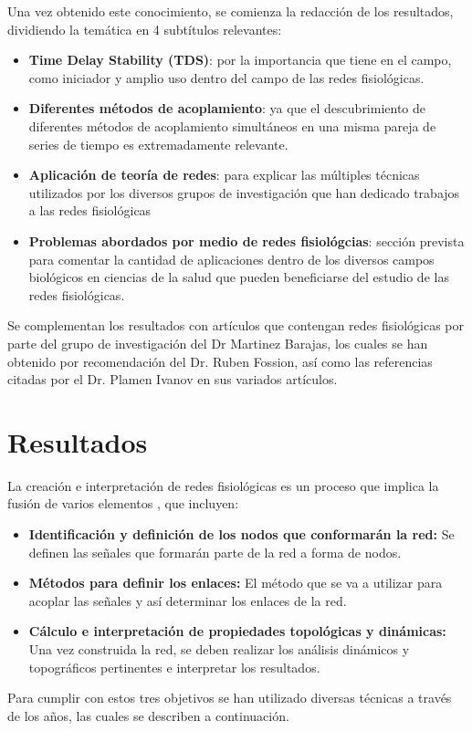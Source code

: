 \documentclass[twoside,twocolumn]{article}
\begin{document}
Una vez obtenido este conocimiento, se comienza la redacción de los resultados, dividiendo la temática en 4 subtítulos relevantes:
\begin{itemize}
  \item \textbf{Time Delay Stability (TDS)}: por la importancia que tiene en el campo, como iniciador y amplio uso dentro del campo de las redes fisiológicas.
  \item \textbf{Diferentes métodos de acoplamiento}: ya que el descubrimiento de diferentes métodos de acoplamiento simultáneos en una misma pareja de series de tiempo es extremadamente relevante.
  \item \textbf{Aplicación de teoría de redes}: para explicar las múltiples técnicas utilizados por los diversos grupos de investigación que han dedicado trabajos a las redes fisiológicas
  \item \textbf{Problemas abordados por medio de redes fisiológcias}: sección prevista para comentar la cantidad de aplicaciones dentro de los diversos campos biológicos en ciencias de la salud que pueden beneficiarse del estudio de las redes fisiológicas.
\end{itemize}

Se complementan los resultados con artículos que contengan redes fisiológicas por parte del grupo de investigación del Dr Martinez Barajas, los cuales se han obtenido por recomendación del Dr. Ruben Fossion, así como las referencias citadas por el Dr. Plamen Ivanov en sus variados artículos.

\section{Resultados}
La creación e interpretación de redes fisiológicas es un proceso que implica la fusión de varios elementos \cite{barajas2021sex}, que incluyen:
\begin{itemize}
  \item \textbf{Identificación y definición de los nodos que conformarán la red:} Se definen las señales que formarán parte de la red a forma de nodos.
  \item \textbf{Métodos para definir los enlaces:} El método que se va a utilizar para acoplar las señales y así determinar los enlaces de la red.
  \item \textbf{Cálculo e interpretación de propiedades topológicas y dinámicas:} Una vez construida la red, se deben realizar los análisis dinámicos y topográficos pertinentes e interpretar los resultados.
\end{itemize}
Para cumplir con estos tres objetivos se han utilizado diversas técnicas a través de los años, las cuales se describen a continuación.
\end{document}
